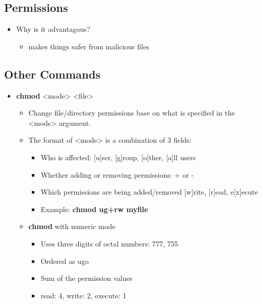 \documentclass{article}
\begin{document}
\subsection*{Permissions}
\begin{itemize}
  \item Why is it advantagous?
  \begin{itemize}
    \item makes things safer from malicious files
  \end{itemize}
\end{itemize}
\subsection*{Other Commands}
\begin{itemize}
  \item \textbf{chmod} <mode> <file>
  \begin{itemize}
    \item Change file/directory permissions base on what is specified in the <mode> argument.
    \item The format of <mode> is a combination of 3 fields:
    \begin{itemize}
      \item Who is affected: [u]ser, [g]roup, [o]ther, [a]ll users
      \item Whether adding or removing permissions: + or -
      \item Which permissions are being added/removed [w]rite, [r]ead, e[x]ecute
      \item Example: \textbf{chmod ug+rw myfile}
      \end{itemize}
    \item \textbf{chmod} with numeric mode
    \begin{itemize}
      \item Uses three digits of octal numbers: 777, 755
      \item Ordered as ugo
      \item Sum of the permission values
      \item read: 4, write: 2, execute: 1
    \end{itemize}
  \end{itemize}
\end{itemize}
\end{document}
